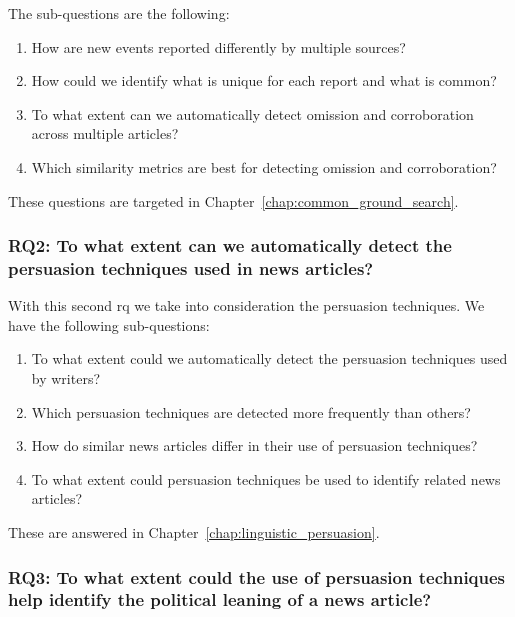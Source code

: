 The sub-questions are the following:
\begin{enumerate}[label={\textbf{RQ1.\arabic*:}},leftmargin=2cm]
    \item How are new events reported differently by multiple sources?
    \item How could we identify what is unique for each report and what is common?
    \item To what extent can we automatically detect omission and corroboration across multiple articles?
    \item Which similarity metrics are best for detecting omission and corroboration?
\end{enumerate}

These questions are targeted in Chapter~\ref{chap:common_ground_search}.

\subsubsection*{RQ2: To what extent can we automatically detect the persuasion techniques used in news articles?}

With this second \acrlong{rq} we take into consideration the persuasion techniques. We have the following sub-questions:

\begin{enumerate}[label={\textbf{RQ2.\arabic*:}},leftmargin=2cm]
    \item To what extent could we automatically detect the persuasion techniques used by writers?
    \item Which persuasion techniques are detected more frequently than others?
    \item How do similar news articles differ in their use of persuasion techniques?
    \item To what extent could persuasion techniques be used to identify related news articles?
\end{enumerate}

These are answered in Chapter~\ref{chap:linguistic_persuasion}.

\subsubsection*{RQ3: To what extent could the use of persuasion techniques help identify the political leaning of a news article?}

